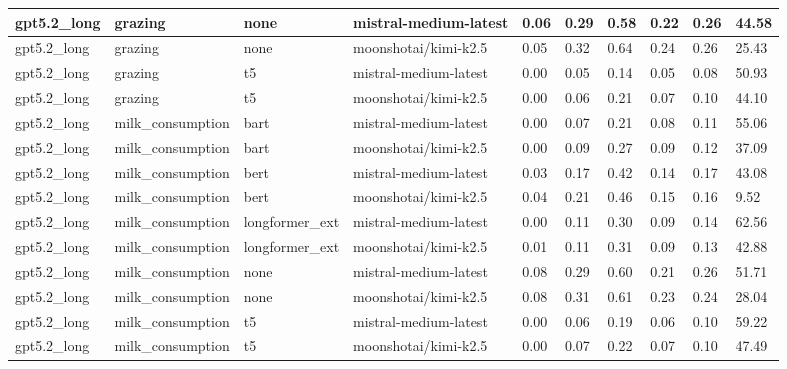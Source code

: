\begin{tabular}{|l|l|l|l|l|l|l|l|l|l|}
 \hline
 gpt5.2\_long & grazing & none & mistral-medium-latest & 0.06 & 0.29 & 0.58 & 0.22 & 0.26 & 44.58 \\
 \hline
 gpt5.2\_long & grazing & none & moonshotai/kimi-k2.5 & 0.05 & 0.32 & 0.64 & 0.24 & 0.26 & 25.43 \\
 \hline
 gpt5.2\_long & grazing & t5 & mistral-medium-latest & 0.00 & 0.05 & 0.14 & 0.05 & 0.08 & 50.93 \\
 \hline
 gpt5.2\_long & grazing & t5 & moonshotai/kimi-k2.5 & 0.00 & 0.06 & 0.21 & 0.07 & 0.10 & 44.10 \\
 \hline
 gpt5.2\_long & milk\_consumption & bart & mistral-medium-latest & 0.00 & 0.07 & 0.21 & 0.08 & 0.11 & 55.06 \\
 \hline
 gpt5.2\_long & milk\_consumption & bart & moonshotai/kimi-k2.5 & 0.00 & 0.09 & 0.27 & 0.09 & 0.12 & 37.09 \\
 \hline
 gpt5.2\_long & milk\_consumption & bert & mistral-medium-latest & 0.03 & 0.17 & 0.42 & 0.14 & 0.17 & 43.08 \\
 \hline
 gpt5.2\_long & milk\_consumption & bert & moonshotai/kimi-k2.5 & 0.04 & 0.21 & 0.46 & 0.15 & 0.16 & 9.52 \\
 \hline
 gpt5.2\_long & milk\_consumption & longformer\_ext & mistral-medium-latest & 0.00 & 0.11 & 0.30 & 0.09 & 0.14 & 62.56 \\
 \hline
 gpt5.2\_long & milk\_consumption & longformer\_ext & moonshotai/kimi-k2.5 & 0.01 & 0.11 & 0.31 & 0.09 & 0.13 & 42.88 \\
 \hline
 gpt5.2\_long & milk\_consumption & none & mistral-medium-latest & 0.08 & 0.29 & 0.60 & 0.21 & 0.26 & 51.71 \\
 \hline
 gpt5.2\_long & milk\_consumption & none & moonshotai/kimi-k2.5 & 0.08 & 0.31 & 0.61 & 0.23 & 0.24 & 28.04 \\
 \hline
 gpt5.2\_long & milk\_consumption & t5 & mistral-medium-latest & 0.00 & 0.06 & 0.19 & 0.06 & 0.10 & 59.22 \\
 \hline
 gpt5.2\_long & milk\_consumption & t5 & moonshotai/kimi-k2.5 & 0.00 & 0.07 & 0.22 & 0.07 & 0.10 & 47.49 \\
\hline
\end{tabular}
